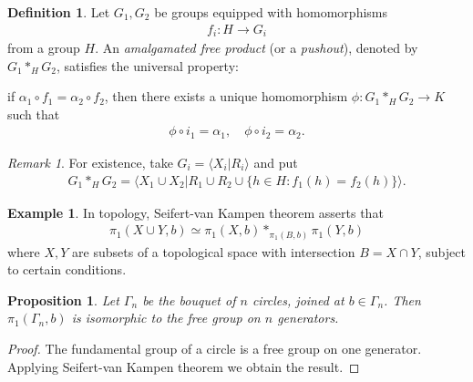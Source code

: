 \documentclass[12pt]{report}
\theoremstyle{plain}
\newtheorem{proposition}[theorem]{Proposition}
\theoremstyle{remark}
\newtheorem*{remark}{Remark}
\theoremstyle{definition}
\newtheorem{definition}[theorem]{Definition}
\newtheorem{example}[theorem]{Example}
\begin{document}
\begin{definition}
    Let $G_1,G_2$ be groups equipped with homomorphisms
    \begin{align*}
        f_i:H\rightarrow G_i
    \end{align*}
    from a group $H$. An \emph{amalgamated free product} (or a \emph{pushout}), denoted by $G_1*_H G_2$, satisfies the universal property:
    \begin{figure}[H]
    \centering
    \end{figure}
    \noindent
    if $\alpha_1\circ f_1 = \alpha_2\circ f_2$, then there exists a unique homomorphism $\phi:G_1*_H G_2\rightarrow K$ such that
    \begin{align*}
        \phi\circ i_1 = \alpha_1,\quad \phi\circ i_2 = \alpha_2.
    \end{align*}
\end{definition}
\begin{remark}
    For existence, take $G_i=\langle X_i|R_i\rangle$ and put
    \begin{align*}
        G_1*_H G_2 = \langle X_1\cup X_2 | R_1\cup R_2\cup \{h\in H:f_1(h)=f_2(h)\}\rangle.
    \end{align*}
\end{remark}

\begin{example}
    In topology, Seifert-van Kampen theorem asserts that
    \begin{align*}
        \pi_1(X\cup Y,b)\simeq \pi_1(X,b)*_{\pi_1(B,b)}\pi_1(Y,b)
    \end{align*}
    where $X,Y$ are subsets of a topological space with intersection $B=X\cap Y$, subject to certain conditions.
\end{example}

\begin{proposition}
    Let $\Gamma_n$ be the bouquet of $n$ circles, joined at $b\in\Gamma_n$. Then $\pi_1(\Gamma_n,b)$ is isomorphic to the free group on $n$ generators.
\end{proposition}
\begin{proof}
    The fundamental group of a circle is a free group on one generator. Applying Seifert-van Kampen theorem we obtain the result.
\end{proof}
\end{document}
